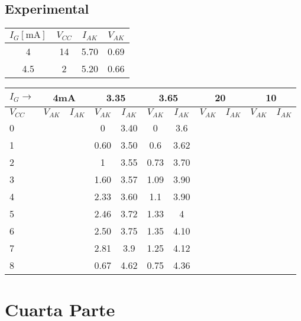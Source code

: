 \subsection{Experimental}
\begin{table}[H]
  \begin{center}
    \begin{tabular}{c|c|c|c}
      $I_{G}[\unit{\milli\ampere}]$ &$V_{CC}$ &$I_{AK}$ &$V_{AK}$ \\
      \hline
      4    &14  &5.70   &0.69 \\
      4.5  &2   &5.20   &0.66 \\
    \end{tabular}
  \end{center} 
\end{table}
\begin{table}[H]
  \begin{center}
    \begin{tabular}{|l|c|c|c|c|c|c|c|c|c|c|}
      \hline
      $I_{G}\rightarrow$ &\multicolumn{2}{c|}{4mA} &\multicolumn{2}{c|}{3.35} &\multicolumn{2}{c|}{3.65} &\multicolumn{2}{c|}{20} &\multicolumn{2}{c|}{10} \\ 
      \hline
      \hline
      $V_{CC}$ &$V_{AK}$ &$I_{AK}$ &$V_{AK}$ &$I_{AK}$ &$V_{AK}$ &$I_{AK}$ &$V_{AK}$ &$I_{AK}$ &$V_{AK}$ &$I_{AK}$\\ 
      \hline
      0    &   &  &0     &3.40    &0    &3.6   &  &  &  \\
      1    &   &  &0.60  &3.50    &0.6  &3.62  &  &  &  \\
      2    &   &  &1     &3.55    &0.73 &3.70  &  &  &  \\
      3    &   &  &1.60  &3.57    &1.09 &3.90  &  &  &  \\
      4    &   &  &2.33  &3.60    &1.1  &3.90  &  &  &  \\
      5    &   &  &2.46  &3.72    &1.33 &4     &  &  &  \\
      6    &   &  &2.50  &3.75    &1.35 &4.10  &  &  &  \\
      7    &   &  &2.81  &3.9     &1.25 &4.12  &  &  &  \\
      8    &   &  &0.67  &4.62    &0.75 &4.36     &  &  &  \\
      \hline
    \end{tabular}
  \end{center}
\end{table}



\section{Cuarta Parte}
